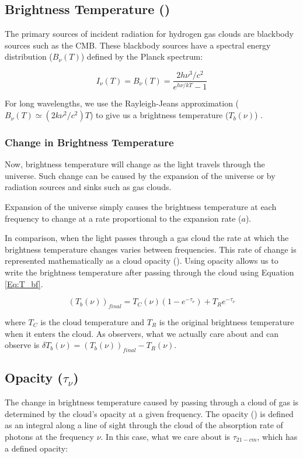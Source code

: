 \subsection{Brightness Temperature (\tb)}
The primary sources of incident radiation for hydrogen gas clouds are blackbody sources such as the CMB. These blackbody sources have a spectral energy distribution ($B_\nu (T)$) defined by the Planck spectrum:

\begin{equation}
I_{\nu} (T) = B_{\nu}(T) = \frac{ 2 h \nu^3 / c^2}{e^{h \nu / k T}-1}
\end{equation}

For long wavelengths, we use the Rayleigh-Jeans approximation ($B_{\nu} (T) \simeq (2 k \nu^2 / c^2) T$) to give us a brightness temperature ($T_b (\nu)$) \cite{carroll2007}. 

\subsubsection{Change in Brightness Temperature}
Now, brightness temperature will change as the light travels through the universe. Such change can be caused by the expansion of the universe or by radiation sources and sinks such as gas clouds. 

Expansion of the universe simply causes the brightness temperature at each frequency to change at a rate proportional to the expansion rate ($a$). 

In comparison, when the light passes through a gas cloud the rate at which the brightness temperature changes varies between frequencies. This rate of change is represented mathematically as a cloud opacity (\tu). Using opacity allows us to write the brightness temperature after passing through the cloud using Equation \ref{Eq:T_bf}. 

\begin{equation}\label{Eq:T_bf}
(T_b (\nu))_{final}= T_{C} (\nu) (1-e^{-\tau_\nu}) +T_{R} e^{-\tau_\nu}
\end{equation}

where $T_{C}$ is the cloud temperature and $T_{R}$ is the original brightness temperature when it enters the cloud. As observers, what we actually care about and can observe is $\delta T_b (\nu) = (T_b (\nu))_{final} - T_R  (\nu)$. 

\subsection{Opacity ($\tau_\nu$)}
The change in brightness temperature caused by passing through a cloud of gas is determined by the cloud's opacity at a given frequency. The opacity (\tu) is defined as an integral along a line of sight through the cloud of the absorption rate of photons at the frequency $\nu$. In this case, what we care about is $\tau_{21-cm}$, which has a defined opacity:

